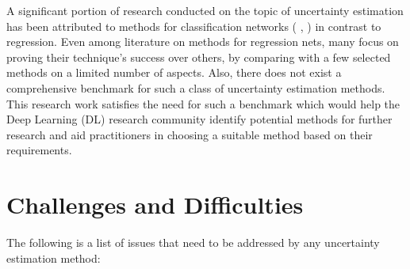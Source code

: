 	A significant portion of research conducted on the topic of uncertainty estimation has been attributed to methods for classification networks ( \cite{sensoy2018evidential},  \cite{malinin2018predictive}) in contrast to regression. Even among literature on methods for regression nets, many focus on proving their technique's success over others, by comparing with a few selected methods on a limited number of aspects. Also, there does not exist a comprehensive benchmark for such a class of uncertainty estimation methods. This research work satisfies the need for such a benchmark which would help the Deep Learning (DL) research community identify potential methods for further research and aid practitioners in choosing a suitable method based on their requirements.     
    \section{Challenges and Difficulties}
    The following is a list of issues that need to be addressed by any uncertainty estimation method:

